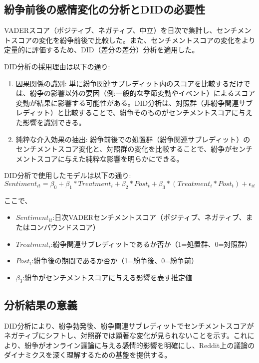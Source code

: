 \documentclass[11pt, a4j]{jreport}
\begin{document}
    \subsection*{紛争前後の感情変化の分析とDIDの必要性}
    VADERスコア（ポジティブ、ネガティブ、中立）を日次で集計し、センチメントスコアの変化を紛争前後で比較した。また、センチメントスコアの変化をより定量的に評価するため、DID（差分の差分）分析を適用した。

    DID分析の採用理由は以下の通り:
    \begin{enumerate}
        \item 因果関係の識別:
            単に紛争関連サブレディット内のスコアを比較するだけでは、紛争の影響以外の要因（例:一般的な季節変動やイベント）によるスコア変動が結果に影響する可能性がある。DID分析は、対照群（非紛争関連サブレディット）と比較することで、紛争そのものがセンチメントスコアに与えた影響を識別できる。
        \item 純粋な介入効果の抽出:
            紛争前後での処置群（紛争関連サブレディット）のセンチメントスコア変化と、対照群の変化を比較することで、紛争がセンチメントスコアに与えた純粋な影響を明らかにできる。
    \end{enumerate}

    DID分析で使用したモデルは以下の通り:
    \begin{equation}
        Sentiment_{it} = \beta_{0} + \beta_{1}*Treatment_{i} + \beta_{2}*Post_{t} + \beta_{3}*(Treatment_{i} * Post_{t}) + \epsilon_{it}
    \end{equation}

    ここで、
    \begin{itemize}
        \item $Sentiment_{it}$:日次VADERセンチメントスコア（ポジティブ、ネガティブ、またはコンパウンドスコア）
        \item $Treatment_{i}$:紛争関連サブレディットであるか否か（1=処置群、0=対照群）
        \item $Post_{t}$:紛争後の期間であるか否か（1=紛争後、0=紛争前）
        \item $\beta_{3}$:紛争がセンチメントスコアに与える影響を表す推定値
    \end{itemize}

    \subsection*{分析結果の意義}
    DID分析により、紛争勃発後、紛争関連サブレディットでセンチメントスコアがネガティブにシフトし、対照群では顕著な変化が見られないことを示す。これにより、紛争がオンライン議論に与える感情的影響を明確にし、Reddit上の議論のダイナミクスを深く理解するための基盤を提供する。
\end{document}
